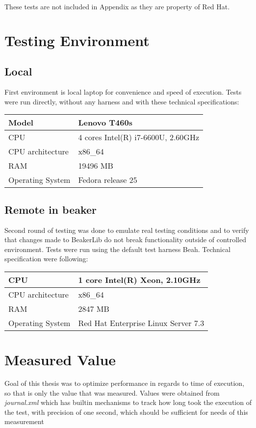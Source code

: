 These tests are not included in Appendix as they are property of Red Hat.

\section{Testing Environment}

\subsection{Local}
First environment is local laptop for convenience and speed of execution. Tests were run directly, without any harness and with these technical specifications: 

\begin{center}
    \begin{tabular}{| l | l |}
    \hline
    Model & Lenovo T460s \\ \hline
    CPU & 4 cores Intel(R) i7-6600U, 2.60GHz \\ \hline
    CPU architecture & x86\_64 \\ \hline
    RAM & 19496 MB   \\ \hline
    Operating System & Fedora release 25 \\ \hline
    \end{tabular}
\end{center}

\subsection{Remote in beaker}
Second round of testing was done to emulate real testing conditions and to verify that changes made to BeakerLib do not break functionality outside of controlled environment. Tests were run using the default test harness Beah. Technical specification were following:

\begin{center}
    \begin{tabular}{| l | l |}
    \hline
    CPU & 1 core Intel(R) Xeon, 2.10GHz \\ \hline
    CPU architecture & x86\_64 \\ \hline
    RAM & 2847 MB   \\ \hline
    Operating System & Red Hat Enterprise Linux Server 7.3 \\ \hline
    \end{tabular}
\end{center}


\section{Measured Value} %
Goal of this thesis was to optimize performance in regards to time of execution, so that is only the value that was measured. Values were obtained from \textit{journal.xml} which has builtin mechanisms to track how long took the execution of the test, with precision of one second, which should  be sufficient for needs of this measurement

